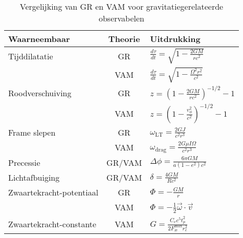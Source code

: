 \begin{table}[ht]
    \centering
    \caption{Vergelijking van GR en VAM voor gravitatiegerelateerde observabelen}
    \label{tab:VAM-GR}
    \begin{tabular}{|l|c|l|}
        \hline
        \textbf{Waarneembaar} & \textbf{Theorie} & \textbf{Uitdrukking} \\
        \hline
        Tijddilatatie & GR & $  \frac{d\tau}{dt} = \sqrt{1 - \frac{2GM}{rc^2}} $ \\
        & VAM & $  \frac{d\tau}{dt} = \sqrt{1 - \frac{\Omega^2 r^2}{c^2}} $ \\
        \hline
        Roodverschuiving & GR & $  z = \left(1 - \frac{2GM}{rc^2} \right)^{-1/2} - 1 $ \\
        & VAM & $  z = \left(1 - \frac{v_\phi^2}{c^2} \right)^{-1/2} - 1 $ \\
        \hline
        Frame slepen & GR & $  \omega_\text{LT} = \frac{2GJ}{c^2 r^3} $ \\
        & VAM & $  \omega_\text{drag} = \frac{2G \mu I \Omega}{c^2 r^3} $ \\
        \hline
        Precessie & GR/VAM & $  \Delta\phi = \frac{6\pi GM}{a(1 - e^2)c^2} $ \\
        \hline
        Lichtafbuiging & GR/VAM & $  \delta = \frac{4GM}{Rc^2} $ \\
        \hline
        Zwaartekracht-potentiaal & GR & $  \Phi = -\frac{GM}{r} $ \\
        & VAM & $  \Phi = -\frac{1}{2} \vec{\omega} \cdot \vec{v} $ \\
        \hline
        Zwaartekracht-constante & VAM & $  G = \frac{C_e c^5 t_p^2}{2 F^{\text{max}}_{\text{\ae}} r_c^2} $ \\
        \hline
    \end{tabular}
\end{table}

